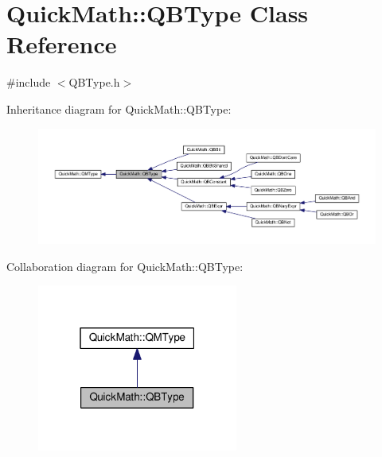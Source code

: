 \hypertarget{classQuickMath_1_1QBType}{}\section{Quick\+Math\+:\+:Q\+B\+Type Class Reference}
\label{classQuickMath_1_1QBType}


{\ttfamily \#include $<$Q\+B\+Type.\+h$>$}



Inheritance diagram for Quick\+Math\+:\+:Q\+B\+Type\+:
\nopagebreak
\begin{figure}[H]
\begin{center}
\leavevmode
\includegraphics[width=350pt]{classQuickMath_1_1QBType__inherit__graph}
\end{center}
\end{figure}


Collaboration diagram for Quick\+Math\+:\+:Q\+B\+Type\+:
\nopagebreak
\begin{figure}[H]
\begin{center}
\leavevmode
\includegraphics[width=187pt]{classQuickMath_1_1QBType__coll__graph}
\end{center}
\end{figure}
